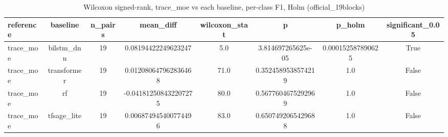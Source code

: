 \begin{table}[htbp]
\centering
\caption{Wilcoxon signed-rank, trace_moe vs each baseline, per-class F1, Holm (official_19blocks)}
\label{tab:wilcoxon_trace_moe_vs_baselines_official_19blocks}
\begin{tabular}{lccccccc}
\toprule
reference & baseline & n\_pairs & mean\_diff & wilcoxon\_stat & p & p\_holm & significant\_0.05 \\
\midrule
trace\_moe & bilstm\_dnn & 19 & 0.08194422249623247 & 5.0 & 3.814697265625e-05 & 0.000152587890625 & True \\
trace\_moe & transformer & 19 & 0.012080647962836468 & 71.0 & 0.3524589538574219 & 1.0 & False \\
trace\_moe & rf & 19 & -0.041812508432207275 & 80.0 & 0.5677604675292969 & 1.0 & False \\
trace\_moe & tfsage\_lite & 19 & 0.006874945400774496 & 83.0 & 0.6507492065429688 & 1.0 & False \\
\bottomrule
\end{tabular}
\end{table}